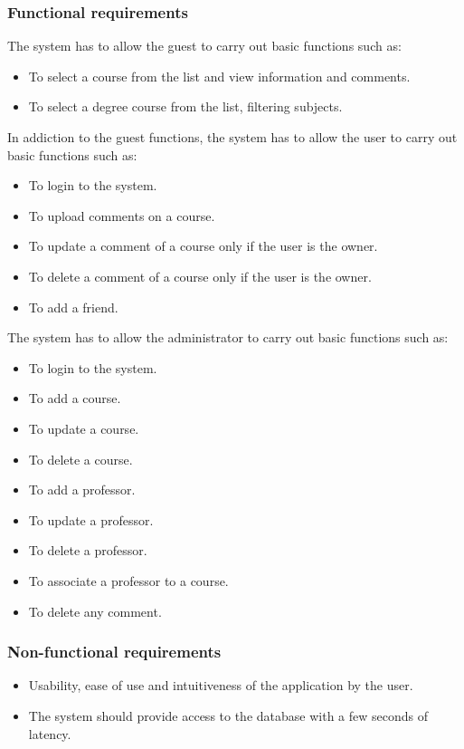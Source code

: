 \documentclass[a4paper]{article}
\begin{document}
\subsubsection{Functional requirements}
The system has to allow the guest to carry out basic functions such as:
\begin{itemize}
\item To select a course from the list and view information and comments.
\item To select a degree course from the list, filtering subjects.
\end{itemize}
In addiction to the guest functions, the system has to allow the user to carry out basic functions such as:
\begin{itemize}
\item To login to the system.
\item To upload comments on a course.
\item To update a comment of a course only if the user is the owner.
\item To delete a comment of a course only if the user is the owner.
\item To add a friend.
\end{itemize}
\vspace{2mm}
The system has to allow the administrator to carry out basic functions such as:
\begin{itemize}
\item To login to the system.
\item To add a course.
\item To update a course.
\item To delete a course.
\item To add a professor.
\item To update a professor.
\item To delete a professor.
\item To associate a professor to a course.
\item To delete any comment.
\end{itemize}
\vspace{2mm}

\subsubsection{Non-functional requirements}
\begin{itemize}
\item Usability, ease of use and intuitiveness of the application by the user.
\item The system should provide access to the database with a few seconds of latency.
\end{itemize}
\end{document}

